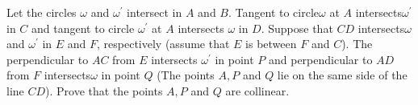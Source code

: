 Let the circles $\omega$ and $\omega^ \prime$ intersect in $A$ and $B$. Tangent to circle$\omega$ at $A$ intersects$\omega^ \prime$ in $C$ and tangent to circle $\omega^ \prime$ at $A$ intersects $\omega$ in $D$. Suppose that $CD$ intersects$\omega$ and $\omega^ \prime$ in $E$ and $F$,  respectively (assume that $E$ is between $F$ and $C$). The perpendicular to $AC$ from $E$ intersects $\omega^ \prime$ in point $P$ and perpendicular to $AD$ from $F$ intersects$\omega$ in point $Q$ (The points $A, P$ and $Q$ lie on the same side of the line $CD$). Prove that the points $A, P$ and $Q$ are collinear.